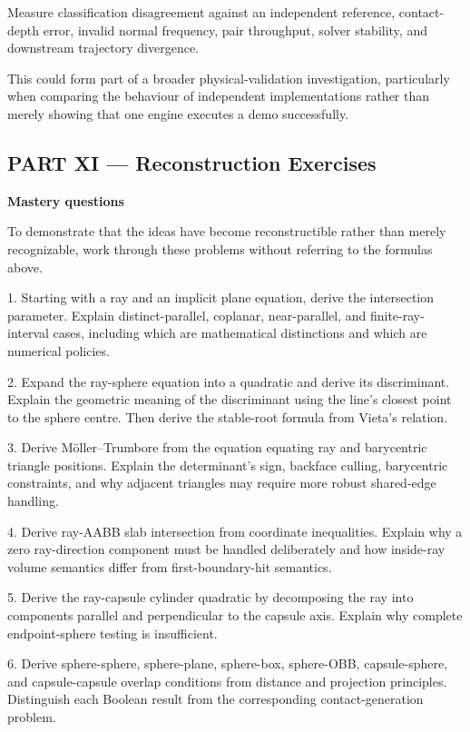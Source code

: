 Measure classification disagreement against an independent reference, contact-depth error, invalid normal frequency, pair throughput, solver stability, and downstream trajectory divergence.

This could form part of a broader physical-validation investigation, particularly when comparing the behaviour of independent implementations rather than merely showing that one engine executes a demo successfully.

\subsection{PART XI --- Reconstruction Exercises}\label{04-visual-computing-ii-ch025-part-xi-reconstruction-exercises}

\hypertarget{04-visual-computing-ii-ch025-part-xi-reconstruction-exercises}{}

\textbf{Mastery questions}

To demonstrate that the ideas have become reconstructible rather than merely recognizable, work through these problems without referring to the formulas above.

1. Starting with a ray and an implicit plane equation, derive the intersection parameter. Explain distinct-parallel, coplanar, near-parallel, and finite-ray-interval cases, including which are mathematical distinctions and which are numerical policies.

2. Expand the ray-sphere equation into a quadratic and derive its discriminant. Explain the geometric meaning of the discriminant using the line's closest point to the sphere centre. Then derive the stable-root formula from Vieta's relation.

3. Derive Möller--Trumbore from the equation equating ray and barycentric triangle positions. Explain the determinant's sign, backface culling, barycentric constraints, and why adjacent triangles may require more robust shared-edge handling.

4. Derive ray-AABB slab intersection from coordinate inequalities. Explain why a zero ray-direction component must be handled deliberately and how inside-ray volume semantics differ from first-boundary-hit semantics.

5. Derive the ray-capsule cylinder quadratic by decomposing the ray into components parallel and perpendicular to the capsule axis. Explain why complete endpoint-sphere testing is insufficient.

6. Derive sphere-sphere, sphere-plane, sphere-box, sphere-OBB, capsule-sphere, and capsule-capsule overlap conditions from distance and projection principles. Distinguish each Boolean result from the corresponding contact-generation problem.

